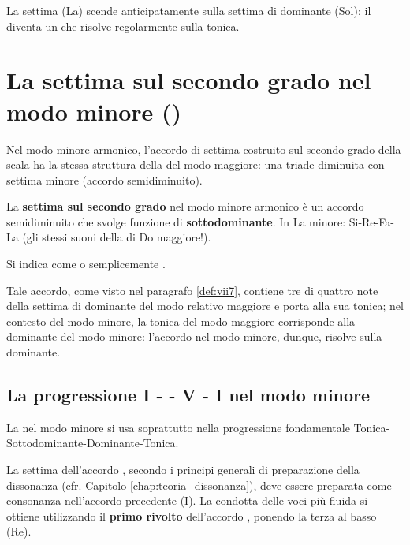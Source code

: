\begin{esempio}
	\label{ex:risoluzione_anticipata}
	La settima (La) scende anticipatamente sulla settima di dominante (Sol): il  diventa un  che risolve regolarmente sulla tonica.
\end{esempio}

\section{La settima sul secondo grado nel modo minore ()}
\label{sec:ii7_minore}

Nel modo minore armonico, l'accordo di settima costruito sul secondo grado della scala ha la stessa struttura della  del modo maggiore: una triade diminuita con settima minore (accordo semidiminuito).

\begin{definizione}
	\label{def:ii7_minore}
	La \textbf{settima sul secondo grado} nel modo minore armonico è un accordo semidiminuito che svolge funzione di \textbf{sottodominante}. In La minore: Si-Re-Fa-La (gli stessi suoni della  di Do maggiore!).
	
	Si indica come  o semplicemente .
\end{definizione}

Tale accordo, come visto nel paragrafo \ref{def:vii7}, contiene tre di quattro note della settima di dominante del modo relativo maggiore e porta alla sua tonica; nel contesto del modo minore, la tonica del modo maggiore corrisponde alla dominante del modo minore: l'accordo  nel modo minore, dunque, risolve sulla dominante.

\subsection{La progressione I -  - V - I nel modo minore}
\label{subsec:progressione_ii7}

La  nel modo minore si usa soprattutto nella progressione fondamentale Tonica-Sottodominante-Dominante-Tonica.

\begin{regola}
	\label{reg:preparazione_ii7}
	La settima dell'accordo , secondo i principi generali di preparazione della dissonanza (cfr. Capitolo \ref{chap:teoria_dissonanza}), deve essere preparata come consonanza nell'accordo precedente (I). La condotta delle voci più fluida si ottiene utilizzando il \textbf{primo rivolto} dell'accordo , ponendo la terza al basso (Re).
\end{regola}

